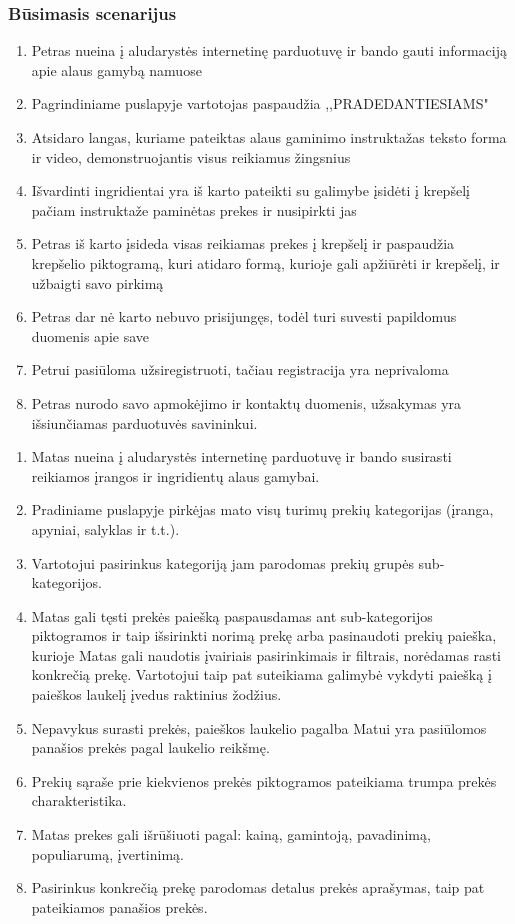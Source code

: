 \documentclass[oneside]{VUMIFPSkursinis}
\begin{document}
		\subsubsection{Būsimasis scenarijus}
				\begin{enumerate}
					\item{Petras nueina į aludarystės internetinę parduotuvę ir bando gauti informaciją apie alaus gamybą namuose}
					\item{Pagrindiniame puslapyje vartotojas paspaudžia ,,PRADEDANTIESIAMS"}
					\item{Atsidaro langas, kuriame pateiktas alaus gaminimo instruktažas teksto forma ir video, demonstruojantis visus reikiamus žingsnius}
					\item{Išvardinti ingridientai yra iš karto pateikti su galimybe įsidėti į krepšelį pačiam instruktaže paminėtas prekes ir nusipirkti jas}
					\item{Petras iš karto įsideda visas reikiamas prekes į krepšelį ir paspaudžia krepšelio piktogramą, kuri atidaro formą, kurioje gali apžiūrėti ir krepšelį, ir užbaigti savo pirkimą}
					\item{Petras dar nė karto nebuvo prisijungęs, todėl turi suvesti papildomus duomenis apie save}
					\item{Petrui pasiūloma užsiregistruoti, tačiau registracija yra neprivaloma}
					\item{Petras nurodo savo apmokėjimo ir kontaktų duomenis, užsakymas yra išsiunčiamas parduotuvės savininkui.}
				\end{enumerate}
				\begin{enumerate}
					\item{Matas nueina į aludarystės internetinę parduotuvę ir bando susirasti reikiamos įrangos ir ingridientų alaus gamybai.}
					\item{Pradiniame puslapyje pirkėjas mato visų turimų prekių kategorijas (įranga, apyniai, salyklas ir t.t.).}
					\item{Vartotojui pasirinkus kategoriją jam parodomas prekių grupės sub-kategorijos.}
					\item{Matas gali tęsti prekės paiešką paspausdamas ant sub-kategorijos piktogramos ir taip išsirinkti norimą prekę arba pasinaudoti prekių paieška, kurioje Matas gali naudotis įvairiais  pasirinkimais ir filtrais, norėdamas rasti konkrečią prekę. Vartotojui taip pat suteikiama galimybė vykdyti paiešką į paieškos laukelį įvedus raktinius žodžius.}
					\item{Nepavykus surasti prekės, paieškos laukelio pagalba Matui yra pasiūlomos panašios prekės pagal laukelio reikšmę.}
					\item{Prekių sąraše prie kiekvienos prekės piktogramos pateikiama trumpa prekės charakteristika. }
					\item{Matas prekes gali išrūšiuoti pagal: kainą, gamintoją, pavadinimą, populiarumą, įvertinimą.}
					\item{Pasirinkus konkrečią prekę parodomas detalus prekės aprašymas, taip pat pateikiamos panašios prekės.}
				\end{enumerate}
\end{document}
